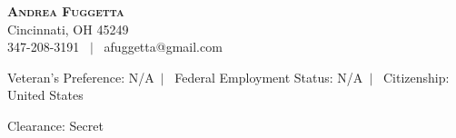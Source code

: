 \documentclass[letterpaper,12pt]{fed-res} %
\begin{document}
\begin{center}
    \textbf{\Huge \scshape Andrea Fuggetta} \\ \vspace{1pt}
    Cincinnati, OH 45249 \\ \vspace{1pt}
     347-208-3191 \ $|$ \ afuggetta@gmail.com \\ \vspace{1pt} %
\end{center}

Veteran's Preference: N/A\ $|$ \ Federal Employment Status: N/A\ $|$ \ Citizenship: United States

Clearance: Secret










% 


\end{document}
